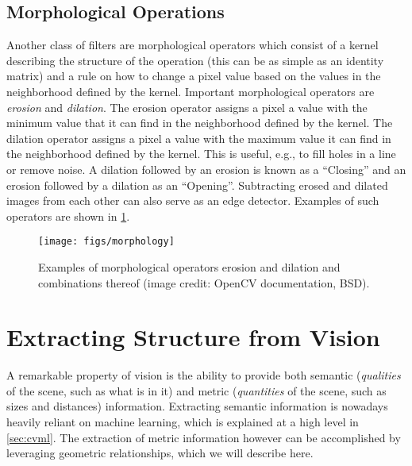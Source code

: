 \subsection{Morphological Operations}

Another class of filters are morphological operators which consist of a kernel describing the structure of the operation (this can be as simple as an identity matrix) and a rule on how to change a pixel value based on the values in the neighborhood defined by the kernel.
%
Important morphological operators are \textsl{erosion} and \textsl{dilation}. The erosion operator assigns a pixel a value with the minimum value that it can find in the neighborhood defined by the kernel. The dilation operator assigns a pixel a value with the maximum value it can find in the neighborhood defined by the kernel. This is useful, e.g., to fill holes in a line or remove noise. A dilation followed by an erosion is known as a ``Closing'' and an erosion followed by a dilation as an ``Opening''. Subtracting erosed and dilated images from each other can also serve as an edge detector. Examples of such operators are shown in \cref{fig:morphology}.

\begin{figure}
    \centering
    \texttt{[image: figs/morphology]}
    \caption{Examples of morphological operators erosion and dilation and combinations thereof (image credit: OpenCV documentation, BSD).
    \label{fig:morphology}}
\end{figure}

\section{Extracting Structure from Vision}\label{sec:vision:structure}

A remarkable property of vision is the ability to provide both semantic (\textsl{qualities} of the scene, such as what is in it) and metric (\textsl{quantities} of the scene, such as sizes and distances) information. Extracting semantic information is nowadays heavily reliant on machine learning, which is explained at a high level in \cref{sec:cvml}. The extraction of metric information however can be accomplished by leveraging geometric relationships, which we will describe here.


